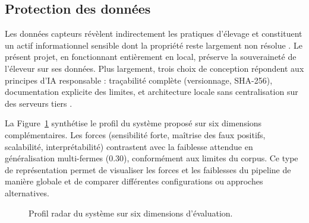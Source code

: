 \subsection{Protection des données}

Les données capteurs révèlent indirectement les pratiques d'élevage et constituent un actif
informationnel sensible dont la propriété reste largement non résolue
\citep{wolfert2017big}. Le présent projet, en fonctionnant entièrement en local, préserve
la souveraineté de l'éleveur sur ses données. Plus largement, trois choix de conception
répondent aux principes d'IA responsable \citep{carbonell2016ethics}: traçabilité complète
(versionnage, SHA-256), documentation explicite des limites, et architecture locale sans
centralisation sur des serveurs tiers
\citep{palma2025scoping,michelena2025plf_review}.

La Figure~\ref{fig:radar_systeme} synthétise le profil du système proposé sur six dimensions
complémentaires. Les forces (sensibilité forte, maîtrise des faux positifs, scalabilité,
interprétabilité) contrastent avec la faiblesse attendue en généralisation multi-fermes
(0.30), conformément aux limites du corpus. Ce type de représentation permet de
visualiser les forces et les faiblesses du pipeline de manière globale et de comparer
différentes configurations ou approches alternatives.

\begin{figure}[H]
    \centering
    \caption{Profil radar du système sur six dimensions d'évaluation.}
    \label{fig:radar_systeme}
\end{figure}

